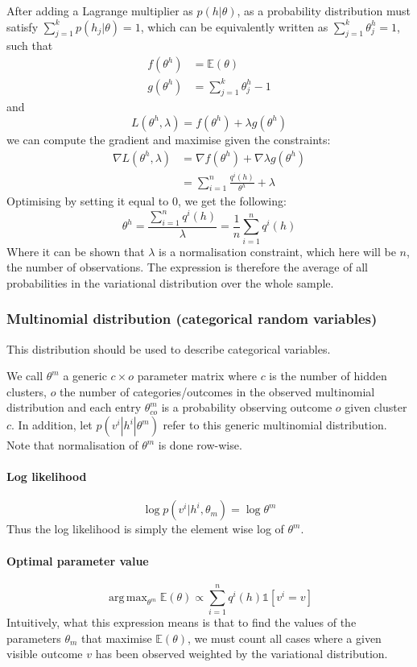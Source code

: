 \documentclass[]{article}
\DeclareMathOperator*{\argmax}{arg\,max}
\begin{document}
After adding a Lagrange multiplier as $p(h|\theta)$, as a probability distribution must satisfy $\sum_{j=1}^{k} p(h_j|\theta) = 1$, which can be equivalently written as $\sum_{j=1}^{k} \theta^h_j = 1$, such that
\begin{align*}
	f(\theta^h) &= \mathbb{E}(\theta) \\
	g(\theta^h) &= \sum_{j=1}^{k} \theta^h_j - 1
\end{align*}
and
\[
	L(\theta^h, \lambda) = f(\theta^h) + \lambda g(\theta^h)
\]
we can compute the gradient and maximise given the constraints:
\begin{align*}
	\nabla L(\theta^h, \lambda) &= \nabla f(\theta^h) + \nabla \lambda g(\theta^h) \\
								&= \sum_{i=1}^{n} \frac{q^i(h)}{\theta^h} + \lambda
\end{align*}
Optimising by setting it equal to 0, we get the following:
\[
	\theta^h = \frac{\sum_{i=1}^{n} q^i(h)}{\lambda} = \frac{1}{n} \sum_{i=1}^{n} q^i(h)
\]
Where it can be shown that $\lambda$ is a normalisation constraint, which here will be $n$, the number of observations. The expression is therefore the average of all probabilities in the variational distribution over the whole sample.

\subsubsection{Multinomial distribution (categorical random variables)}

This distribution should be used to describe categorical variables.

We call $\theta^{m}$ a generic $c \times o$ parameter matrix where $c$ is the number of hidden clusters, $o$ the number of categories/outcomes in the observed multinomial distribution and each entry $\theta^{m}_{co}$ is a probability observing outcome $o$ given cluster $c$. In addition, let $p(v^i|h^i|\theta^m)$ refer to this generic multinomial distribution. Note that normalisation of $\theta^{m}$ is done row-wise.

\paragraph{Log likelihood}
\[
	\log p(v^i|h^i,\theta_m) = \log \theta^{m}
\]
Thus the log likelihood is simply the element wise log of $\theta^{m}$. 
\paragraph{Optimal parameter value}
\[
	\argmax_{\theta^{m}} \mathbb{E}(\theta) \propto \sum_{i=1}^{n} q^i(h) \mathbb{1}{[v^i = v]}
\]
Intuitively, what this expression means is that to find the values of the parameters $\theta_m$ that maximise $\mathbb{E}(\theta)$, we must count all cases where a given visible outcome $v$ has been observed weighted by the variational distribution.
\end{document}
